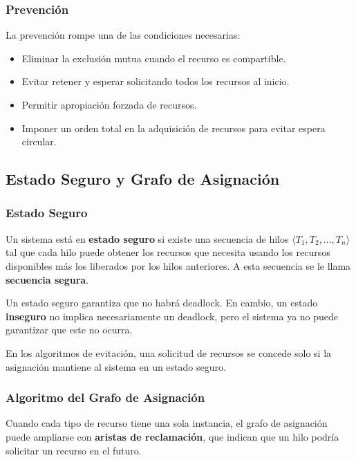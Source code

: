 \documentclass[12pt,letterpaper]{article}
\begin{document}
\subsubsection*{Prevención}

La prevención rompe una de las condiciones necesarias:

\begin{itemize}
\item Eliminar la exclusión mutua cuando el recurso es compartible.
\item Evitar retener y esperar solicitando todos los recursos al inicio.
\item Permitir apropiación forzada de recursos.
\item Imponer un orden total en la adquisición de recursos para evitar espera circular.
\end{itemize}

\subsection*{Estado Seguro y Grafo de Asignación}

\subsubsection*{Estado Seguro}

Un sistema está en \textbf{estado seguro} si existe una secuencia de hilos
$\langle T_1, T_2, \dots, T_n \rangle$ tal que cada hilo puede obtener los recursos que necesita usando los
recursos disponibles más los liberados por los hilos anteriores. A esta secuencia se le llama
\textbf{secuencia segura}.

Un estado seguro garantiza que no habrá deadlock. En cambio, un estado \textbf{inseguro} no implica
necesariamente un deadlock, pero el sistema ya no puede garantizar que este no ocurra.

En los algoritmos de evitación, una solicitud de recursos se concede solo si la asignación mantiene al sistema
en un estado seguro.

\subsubsection*{Algoritmo del Grafo de Asignación}

Cuando cada tipo de recurso tiene una sola instancia, el grafo de asignación puede ampliarse con
\textbf{aristas de reclamación}, que indican que un hilo podría solicitar un recurso en el futuro.
\end{document}
